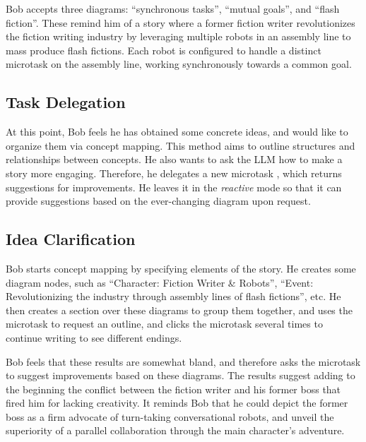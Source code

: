 Bob accepts three diagrams: ``synchronous tasks'', ``mutual goals'', and ``flash fiction''. These remind him of a story where a former fiction writer revolutionizes the fiction writing industry by leveraging multiple robots in an assembly line to mass produce flash fictions. Each robot is configured to handle a distinct microtask on the assembly line, working synchronously towards a common goal.

\subsection*{Task Delegation}
At this point, Bob feels he has obtained some concrete ideas, and would like to organize them via concept mapping.
This method aims to outline structures and relationships between concepts. He also wants to ask the LLM how to make a story more engaging. Therefore, he delegates a new microtask \CboxS{\textcolor{white}{Improve}}, which returns suggestions for improvements.
He leaves it in the \textit{reactive} mode so that it can provide suggestions based on the ever-changing diagram upon request.

\subsection*{Idea Clarification}
Bob starts concept mapping by specifying elements of the story. He creates some diagram nodes, such as ``Character: Fiction Writer \& Robots'', ``Event: Revolutionizing the industry through assembly lines of flash fictions'', etc. He then creates a section over these diagrams to group them together, and uses the microtask \DboxS{\textcolor{white}{Draft}} to request an outline, and clicks the \FboxS{\textcolor{white}{Freewrite}} microtask several times to continue writing to see different endings.

Bob feels that these results are somewhat bland, and therefore asks the microtask \CboxS{\textcolor{white}{Improve}} to suggest improvements based on these diagrams. The results suggest adding to the beginning the conflict between the fiction writer and his former boss that fired him for lacking creativity. It reminds Bob that he could depict the former boss as a firm advocate of turn-taking conversational robots, and unveil the superiority of a parallel collaboration through the main character's adventure.

